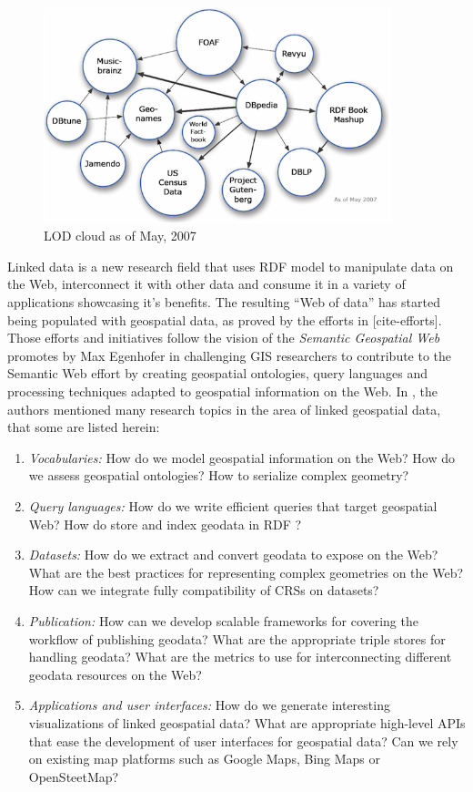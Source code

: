   


\begin{figure}[ht!]
\includegraphics[width=0.9\textwidth]{img/lod-cloud2007.png}
\caption{LOD cloud as of May, 2007}
\label{fig:lodcloud2007}
\end{figure}

Linked data is a new research field that uses RDF model to manipulate data on the Web, interconnect it with other data and consume it in a variety of applications showcasing it's benefits. The resulting ``Web of data'' has started being populated with geospatial data, as proved by the efforts in [cite-efforts]. Those efforts and initiatives follow the vision of the \textit{Semantic Geospatial Web} promotes by Max Egenhofer in \cite{egenhofer12} challenging GIS researchers to contribute to the Semantic Web effort by creating geospatial ontologies, query languages and processing techniques adapted to geospatial information on the Web. In \cite{koubarakis12}, the authors mentioned many research topics in the area of linked geospatial data, that some are listed herein:

\begin{enumerate}


\item \textit{Vocabularies:} How do we model geospatial information on the Web? How do we assess geospatial ontologies? How to serialize complex geometry? 
\item \textit{Query languages:} How do we write efficient queries that target geospatial Web? How do store and index geodata in RDF ?
\item \textit{Datasets:} How do we extract and convert geodata to expose on the Web? What are the best practices for representing complex geometries on the Web? How can we integrate fully compatibility of CRSs on datasets? 
\item \textit{Publication:} How can we develop scalable frameworks for covering the workflow of publishing geodata? What are the appropriate triple stores for handling geodata? What are the metrics to use for interconnecting different geodata resources on the Web?  
\item \textit{Applications and user interfaces:} How do we generate interesting visualizations of linked geospatial data? What are appropriate high-level APIs that ease the development of user interfaces for geospatial data? Can we rely on existing map platforms such as Google Maps, Bing Maps or OpenSteetMap?
\end{enumerate}

